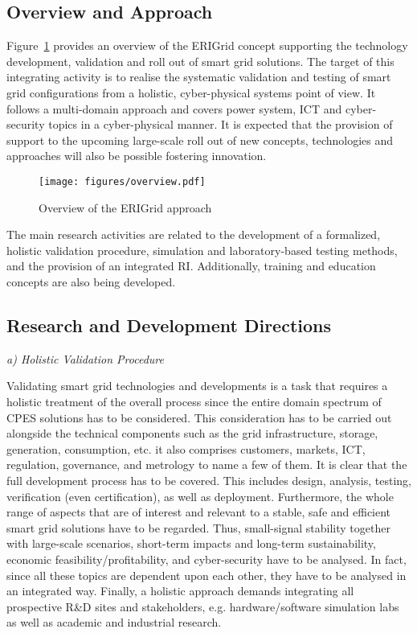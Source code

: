 \documentclass[runningheads,a4paper]{llncs}
\begin{document}
\subsection{Overview and Approach}

Figure~\ref{fig:overiew} provides an overview of the ERIGrid concept supporting the technology development, validation and roll out of smart grid solutions. The target of this integrating activity is to realise the systematic validation and testing of smart grid configurations from a holistic, cyber-physical systems point of view. It follows a multi-domain approach and covers power system, ICT and cyber-security topics in a cyber-physical manner. It is expected that the provision of support to the upcoming large-scale roll out of new concepts, technologies and approaches will also be possible fostering innovation.

\begin{figure}[!htbp]
	\centering
	\texttt{[image: figures/overview.pdf]}
	\caption{Overview of the ERIGrid approach}
	\label{fig:overiew}
\end{figure}

The main research activities are related to the development of a formalized, holistic validation procedure, simulation and laboratory-based testing methods, and the provision of an integrated RI. Additionally, training and education concepts are also being developed. 

\subsection{Research and Development Directions}

\noindent \textit{a) Holistic Validation Procedure\\[-0.5em]}

\noindent Validating smart grid technologies and developments is a task that requires a holistic treatment of the overall process since the entire domain spectrum of CPES solutions has to be considered. This consideration has to be carried out alongside the technical components such as the grid infrastructure, storage, generation, consumption, etc. it also comprises customers, markets, ICT, regulation, governance, and metrology to name a few of them. It is clear that the full development process has to be covered. This includes design, analysis, testing, verification (even certification), as well as deployment. Furthermore, the whole range of aspects that are of interest and relevant to a stable, safe and efficient smart grid solutions have to be regarded. Thus, small-signal stability together with large-scale scenarios, short-term impacts and long-term sustainability, economic feasibility/profitability, and cyber-security have to be analysed. In fact, since all these topics are dependent upon each other, they have to be analysed in an integrated way. Finally, a holistic approach demands integrating all prospective R\&D sites and stakeholders, e.g. hardware/software simulation labs as well as academic and industrial research. \cite{Strasser:2017}    
\end{document}
